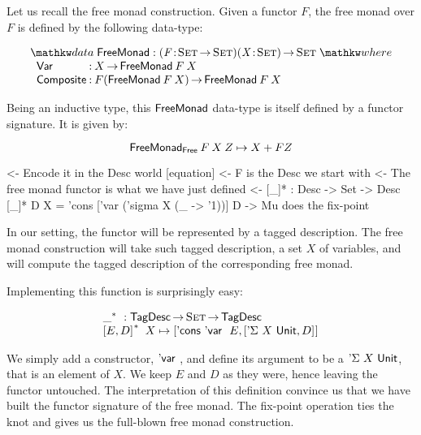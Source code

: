 \newcommand{\FMFreeMonad}{\D{FreeMonad}}
\newcommand{\FMFreeMonadF}{\D{FreeMonad$_{\CN{Free}}$}}
\newcommand{\FMVar}{\C{Var}}
\newcommand{\FMComposite}{\C{Composite}}

Let us recall the free monad construction. Given a functor $F$, the
free monad over $F$ is defined by the following data-type:

\[
\stk{
\data \FMFreeMonad : \PITEL{\V{F}}{\Set \To \Set} 
                     \PI{\V{X}}{\Set} 
                     \Set 
\where \\
\;\;\begin{array}{@{}l@{\::\:}l@{\quad}l}
    \FMVar           & X \To \FMFreeMonad\: F\: X                            \\
    \FMComposite     & F (\FMFreeMonad\: F\: X) \To \FMFreeMonad\: F\: X    
\end{array}
}
\]


Being an inductive type, this $\FMFreeMonad$ data-type is itself
defined by a functor signature. It is given by:

\[
\FMFreeMonadF\: F\: X\: Z \mapsto X + F Z
\]

\begin{wstructure}
    <- Encode it in the Desc world [equation]
        <- F is the Desc we start with
        <- The free monad functor is what we have just defined
        <- [\_]* : Desc -> Set -> Desc
           [\_]* D X = 'cons ['var ('sigma X (\_ -> '1))] D
        -> Mu does the fix-point
\end{wstructure}

In our setting, the functor will be represented by a tagged
description. The free monad construction will take such tagged
description, a set $X$ of variables, and will compute the tagged
description of the corresponding free monad.

Implementing this function is surprisingly easy:

\[\stk{
\FreeMonad{\_} : \TagDesc \To \Set \To \TagDesc \\
\FreeMonad{\pair{E}{D}{}}\:X \mapsto
    \pair{\ListCons{\DVar{}}{E}}
         {\pair{\DSigma{X}{\Unit}}{D}{}}{}
}\]

We simply add a constructor, $\DVar{}$, and define its argument to be
a $\DSigma{X}{\Unit}$, that is an element of $X$. We keep $E$ and $D$
as they were, hence leaving the functor untouched. The interpretation
of this definition convince us that we have built the functor
signature of the free monad. The fix-point operation ties the knot and
gives us the full-blown free monad construction.


